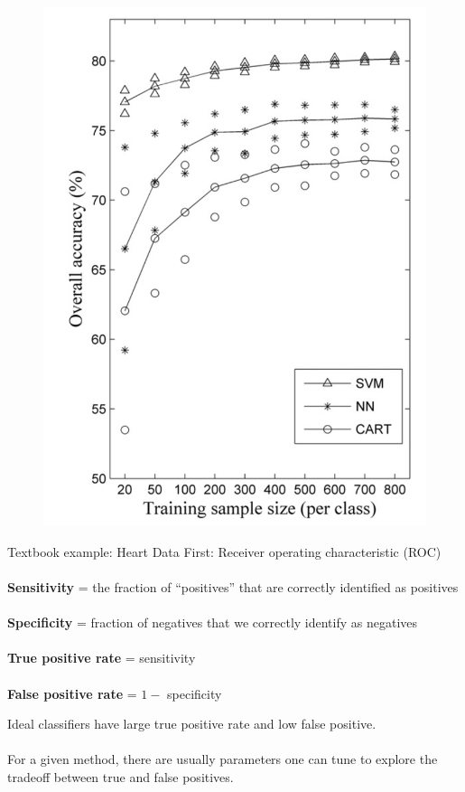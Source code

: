 \documentclass[mathserif, aspectratio=169]{beamer}
\begin{document}
\begin{frame}{}
	\begin{figure}
		\includegraphics[height=\textheight]{shao_performance}
		\caption*{}
	\end{figure}
\end{frame}

\begin{frame}{Textbook example: Heart Data}
	First: Receiver operating characteristic (ROC)\\~\\

	\textbf{Sensitivity} = the fraction of ``positives'' that are correctly identified as positives  \\~\\

	\textbf{Specificity} = fraction of negatives that we correctly identify as negatives \\~\\

	\textbf{True positive rate} = sensitivity\\~\\

	\textbf{False positive rate} = $1-$ specificity

	Ideal classifiers have large true positive rate and low false positive.  \\~\\

	For a given method, there are usually parameters one can tune to explore the tradeoff between true and false positives.
\end{frame}
\end{document}
